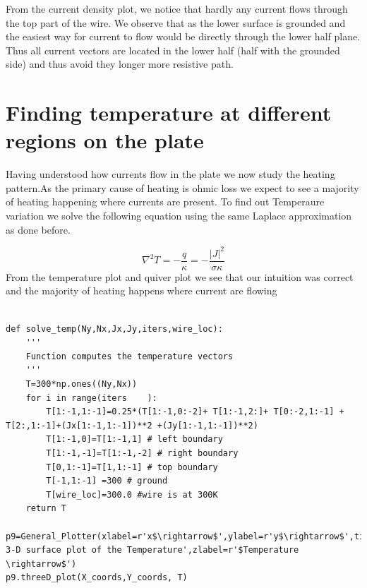 \documentclass{article}
\begin{document}
From the current density plot, we notice that hardly any current flows through the top part
of the wire. We observe that as the lower surface is grounded and the easiest way for current
to flow would be directly through the lower half plane. Thus all current vectors are located in
the lower half (half with the grounded side) and thus avoid they longer more resistive path.


\section{Finding temperature at different regions on the plate}

Having understood how currents flow in the plate we now study the heating pattern.As the
primary cause of heating is ohmic loss we expect to see a majority of heating happening where
currents are present. To find out Temperaure variation we solve the following equation using
the same Laplace approximation as done before.

\begin{equation}
    \nabla^2 T = -\frac{q}{\kappa} = -\frac{|J|^2}{\sigma \kappa}
\end{equation}
From the temperature plot and quiver plot we see that our intuition was correct and the majority of heating happens
where current are flowing
\begin{lstlisting}

def solve_temp(Ny,Nx,Jx,Jy,iters,wire_loc):
    '''
    Function computes the temperature vectors
    '''
    T=300*np.ones((Ny,Nx))
    for i in range(iters    ):
        T[1:-1,1:-1]=0.25*(T[1:-1,0:-2]+ T[1:-1,2:]+ T[0:-2,1:-1] + T[2:,1:-1]+(Jx[1:-1,1:-1])**2 +(Jy[1:-1,1:-1])**2)
        T[1:-1,0]=T[1:-1,1] # left boundary
        T[1:-1,-1]=T[1:-1,-2] # right boundary
        T[0,1:-1]=T[1,1:-1] # top boundary
        T[-1,1:-1] =300 # ground
        T[wire_loc]=300.0 #wire is at 300K
    return T

p9=General_Plotter(xlabel=r'x$\rightarrow$',ylabel=r'y$\rightarrow$',title='The 3-D surface plot of the Temperature',zlabel=r'$Temperature \rightarrow$')
p9.threeD_plot(X_coords,Y_coords, T)

\end{lstlisting}
\end{document}
